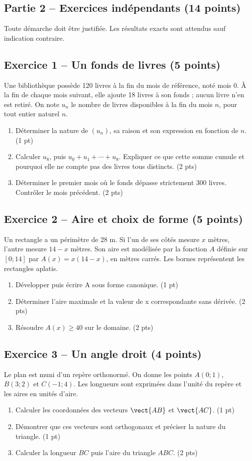 \clearpage\subsection*{Partie 2 -- Exercices indépendants (14 points)}
Toute démarche doit être justifiée. Les résultats exacts sont attendus sauf indication contraire.
\subsection*{Exercice 1 -- Un fonds de livres (5 points)}
Une bibliothèque possède 120 livres à la fin du mois de référence, noté mois 0. À la fin de chaque mois suivant, elle ajoute 18 livres à son fonds ; aucun livre n’en est retiré. On note $u_n$ le nombre de livres disponibles à la fin du mois $n$, pour tout entier naturel $n$.
\begin{enumerate}
\item Déterminer la nature de $(u_n)$, sa raison et son expression en fonction de $n$. \hfill(1 pt)
\item Calculer $u_8$, puis $u_0+u_1+\cdots+u_8$. Expliquer ce que cette somme cumule et pourquoi elle ne compte pas des livres tous distincts. \hfill(2 pts)
\item Déterminer le premier mois où le fonds dépasse strictement 300 livres. Contrôler le mois précédent. \hfill(2 pts)
\end{enumerate}
\subsection*{Exercice 2 -- Aire et choix de forme (5 points)}
Un rectangle a un périmètre de 28 m. Si l’un de ses côtés mesure $x$ mètres, l’autre mesure $14-x$ mètres. Son aire est modélisée par la fonction $A$ définie sur $[0;14]$ par $A(x)=x(14-x)$, en mètres carrés. Les bornes représentent les rectangles aplatis.
\begin{enumerate}
\item Développer puis écrire A sous forme canonique. \hfill(1 pt)
\item Déterminer l’aire maximale et la valeur de x correspondante sans dérivée. \hfill(2 pts)
\item Résoudre $A(x)\geq40$ sur le domaine. \hfill(2 pts)
\end{enumerate}
\subsection*{Exercice 3 -- Un angle droit (4 points)}
Le plan est muni d’un repère orthonormé. On donne les points $A(0;1)$, $B(3;2)$ et $C(-1;4)$. Les longueurs sont exprimées dans l’unité du repère et les aires en unités d’aire.
\begin{enumerate}
\item Calculer les coordonnées des vecteurs $\vect{AB}$ et $\vect{AC}$. \hfill(1 pt)
\item Démontrer que ces vecteurs sont orthogonaux et préciser la nature du triangle. \hfill(1 pt)
\item Calculer la longueur $BC$ puis l’aire du triangle $ABC$. \hfill(2 pts)
\end{enumerate}
